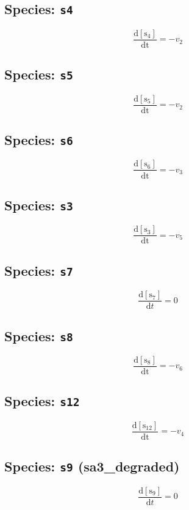 \documentclass[11pt,a4paper]{scrartcl}
\begin{document}
\subsection{Species: \texttt{s4}}
\begin{equation}
\frac{\mathrm{d[s_4]}}{\mathrm {dt}}= -v_{2}
\end{equation}
\subsection{Species: \texttt{s5}}
\begin{equation}
\frac{\mathrm{d[s_5]}}{\mathrm {dt}}= -v_{2}
\end{equation}
\subsection{Species: \texttt{s6}}
\begin{equation}
\frac{\mathrm{d[s_6]}}{\mathrm {dt}}= -v_{3}
\end{equation}
\subsection{Species: \texttt{s3}}
\begin{equation}
\frac{\mathrm{d[s_3]}}{\mathrm {dt}}= -v_{5}
\end{equation}
\subsection{Species: \texttt{s7}}
\begin{equation}
\frac{\mathrm{d[s_7]}}{\mathrm dt}= 0
\end{equation}
\subsection{Species: \texttt{s8}}
\begin{equation}
\frac{\mathrm{d[s_8]}}{\mathrm {dt}}= -v_{6}
\end{equation}
\subsection{Species: \texttt{s12}}
\begin{equation}
\frac{\mathrm{d[s_{12}]}}{\mathrm {dt}}= -v_{4}
\end{equation}
\subsection{Species: \texttt{s9} (sa3\_degraded)}
\begin{equation}
\frac{\mathrm {d[s_9]}}{\mathrm dt}= 0
\end{equation}
\end{document}
